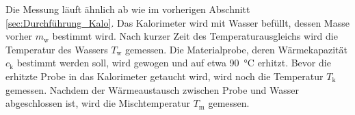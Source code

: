 Die Messung läuft ähnlich ab wie im vorherigen Abschnitt \ref{sec:Durchführung_Kalo}.
Das Kalorimeter wird mit Wasser befüllt, dessen Masse vorher $m_\text{w}$ bestimmt wird.
Nach kurzer Zeit des Temperaturausgleichs wird die Temperatur des Wassers $T_\text{w}$ gemessen.
Die Materialprobe, deren Wärmekapazität $c_\text{k}$ bestimmt werden soll, wird gewogen und auf etwa \SI{90}{\celsius} erhitzt.
Bevor die erhitzte Probe in das Kalorimeter getaucht wird, wird noch die Temperatur $T_\text{k}$ gemessen.
Nachdem der Wärmeaustausch zwischen Probe und Wasser abgeschlossen ist, wird die Mischtemperatur $T_\text{m}$ gemessen.
